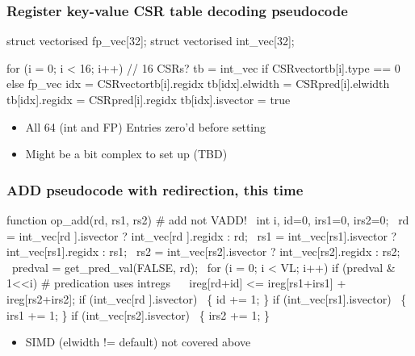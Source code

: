 \documentclass[slidestop]{beamer}
\begin{document}
\begin{frame}[fragile]
\frametitle{Register key-value CSR table decoding pseudocode}

\begin{semiverbatim}
struct vectorised fp\_vec[32];
struct vectorised int\_vec[32];

for (i = 0; i < 16; i++) // 16 CSRs?
   tb = int\_vec if CSRvectortb[i].type == 0 else fp\_vec
   idx = CSRvectortb[i].regidx
   tb[idx].elwidth  = CSRpred[i].elwidth
   tb[idx].regidx   = CSRpred[i].regidx
   tb[idx].isvector = true
\end{semiverbatim}

 \begin{itemize}
   \item All 64 (int and FP) Entries zero'd before setting
   \item Might be a bit complex to set up (TBD)
  \end{itemize}

\end{frame}


\begin{frame}[fragile]
\frametitle{ADD pseudocode with redirection, this time}

\begin{semiverbatim}
function op\_add(rd, rs1, rs2) # add not VADD!
  int i, id=0, irs1=0, irs2=0;
  rd  = int\_vec[rd ].isvector ? int\_vec[rd ].regidx : rd;
  rs1 = int\_vec[rs1].isvector ? int\_vec[rs1].regidx : rs1;
  rs2 = int\_vec[rs2].isvector ? int\_vec[rs2].regidx : rs2;
  predval = get\_pred\_val(FALSE, rd);
  for (i = 0; i < VL; i++)
    if (predval \& 1<<i) # predication uses intregs
       ireg[rd+id] <= ireg[rs1+irs1] + ireg[rs2+irs2];
    if (int\_vec[rd ].isvector)  \{ id += 1; \}
    if (int\_vec[rs1].isvector)  \{ irs1 += 1; \}
    if (int\_vec[rs2].isvector)  \{ irs2 += 1; \}
\end{semiverbatim}

  \begin{itemize}
   \item SIMD (elwidth != default) not covered above
  \end{itemize}
\end{frame}
\end{document}
